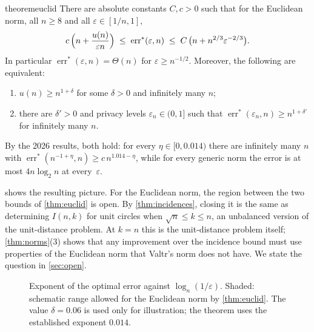 \documentclass[anonymous,a4paper,USenglish,cleveref,autoref,thm-restate]{socg-lipics-v2021}
\newcommand{\eps}{\varepsilon}
\newcommand{\errs}{\operatorname{err}^*}
\begin{document}
\begin{restatable}{theorem}{euclid}
\label{thm:euclid}
There are absolute constants $C,c>0$ such that for the Euclidean norm, all $n\ge8$ and all $\eps\in[1/n,1]$,
\[
  c\,\Bigl(n+\frac{u(n)}{\eps n}\Bigr)\;\le\;\errs(\eps,n)\;\le\;C\,\bigl(n+n^{2/3}\eps^{-2/3}\bigr).
\]
In particular $\errs(\eps,n)=\Theta(n)$ for $\eps\ge n^{-1/2}$. Moreover, the following are equivalent:
\begin{enumerate}
\item $u(n)\ge n^{1+\delta}$ for some $\delta>0$ and infinitely many $n$;
\item there are $\delta'>0$ and privacy levels $\eps_n\in(0,1]$ such that $\errs(\eps_n,n)\ge n^{1+\delta'}$ for infinitely many $n$.
\end{enumerate}
By the 2026 results, both hold: for every $\eta\in[0,0.014)$ there are infinitely many $n$ with $\errs(n^{-1+\eta},n)\ge c\,n^{1.014-\eta}$, while for every generic norm the error is at most $4n\log_2 n$ at every~$\eps$.
\end{restatable}

 shows the resulting picture. For the Euclidean norm, the region between the two bounds of \cref{thm:euclid} is open. By \cref{thm:incidences}, closing it is the same as determining $I(n,k)$ for unit circles when $\sqrt n\le k\le n$, an unbalanced version of the unit-distance problem. At $k=n$ this is the unit-distance problem itself; \cref{thm:norms}(3) shows that any improvement over the incidence bound must use properties of the Euclidean norm that Valtr's norm does not have. We state the question in \cref{sec:open}.

\begin{figure}[!t]
\centering
{}
\caption{Exponent of the optimal error against $\log_n(1/\eps)$. Shaded: schematic range allowed for the Euclidean norm by \cref{thm:euclid}. The value $\delta=0.06$ is used only for illustration; the theorem uses the established exponent $0.014$.}
\label{fig:rates}
\end{figure}
\end{document}
